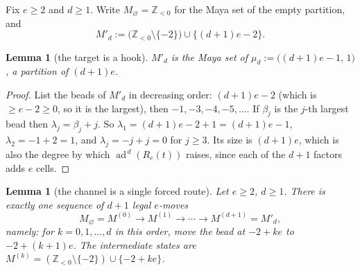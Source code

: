 \documentclass[11pt]{article}
\newtheorem{lemma}[theorem]{Lemma}
\theoremstyle{definition}
\DeclareMathOperator{\ad}{ad}
\newcommand{\Z}{\mathbb{Z}}
\begin{document}
Fix $e\ge2$ and $d\ge1$.  Write $M_\varnothing=\Z_{<0}$ for the Maya set of the empty
partition, and
\[
  M'_d:=\bigl(\Z_{<0}\setminus\{-2\}\bigr)\cup\bigl\{(d+1)e-2\bigr\}.
\]

\begin{lemma}[the target is a hook]\label{lem:hook}
$M'_d$ is the Maya set of $\mu_d:=\bigl((d+1)e-1,\,1\bigr)$, a partition of $(d+1)e$.
\end{lemma}

\begin{proof}
List the beads of $M'_d$ in decreasing order: $(d+1)e-2$ (which is $\ge e-2\ge0$, so it is
the largest), then $-1,-3,-4,-5,\dots$.  If $\beta_j$ is the $j$-th largest bead then
$\lambda_j=\beta_j+j$.  So $\lambda_1=(d+1)e-2+1=(d+1)e-1$, $\lambda_2=-1+2=1$, and
$\lambda_j=-j+j=0$ for $j\ge3$.  Its size is $(d+1)e$, which is also the degree by which
$\ad^{\,d}(R_e(t))$ raises, since each of the $d+1$ factors adds $e$ cells.
\end{proof}

\begin{lemma}[the channel is a single forced route]\label{lem:unique}
Let $e\ge2$, $d\ge1$.  There is exactly one sequence of $d+1$ legal $e$-moves
\[
  M_\varnothing=M^{(0)}\longrightarrow M^{(1)}\longrightarrow\cdots\longrightarrow M^{(d+1)}=M'_d ,
\]
namely: for $k=0,1,\dots,d$ in this order, move the bead at $-2+ke$ to $-2+(k+1)e$.  The
intermediate states are $M^{(k)}=(\Z_{<0}\setminus\{-2\})\cup\{-2+ke\}$.
\end{lemma}
\end{document}
